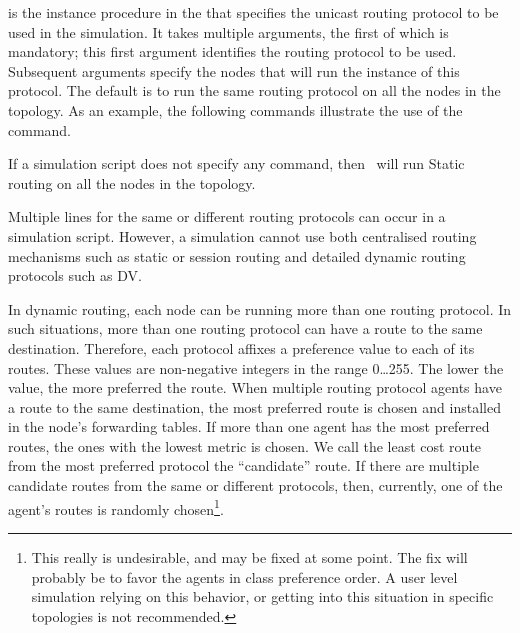 is the instance procedure in the 
that specifies the unicast routing protocol to be used in the simulation.
It takes multiple arguments, the first of which is mandatory;
this first argument identifies the routing protocol to be used.
Subsequent arguments specify the nodes
that will run the instance of this protocol.
The default is to run the same routing protocol
on all the nodes in the topology.
As an example, the following commands illustrate the use of the
 command.
If a simulation script does not specify any  command,
then \ns\ will run Static routing on all the nodes in the topology.

Multiple  lines for the same or different routing 
protocols can occur in a simulation script.
However, a simulation cannot use both
centralised routing mechanisms such as static or session routing and 
detailed dynamic routing protocols such as DV.

In dynamic routing, each node can be running more than one routing protocol.
In such situations, more than one routing protocol can have a route to the
same destination.
Therefore, each protocol affixes a preference value to each of its routes.
These values are non-negative integers in the range 0\ldots255.
The lower the value, the more preferred the route.
When multiple routing protocol agents have a route to the same destination,
the most preferred route is chosen and
installed in the node's forwarding tables.
If more than one agent has the most preferred routes,
the ones with the lowest metric is chosen.
We call the least cost route from the most preferred protocol the
``candidate'' route.
If there are multiple candidate routes from the same or different protocols,
then, currently,
one of the agent's routes is randomly chosen\footnote{%
This really is undesirable, and may be fixed at some point.
The fix will probably be to favor the agents in class preference order.
A user level simulation relying on this behavior,
or getting into this situation in specific topologies is
not recommended.}.

